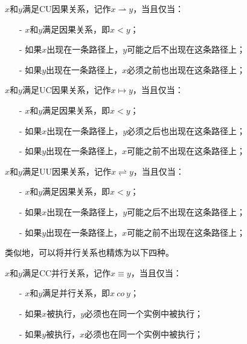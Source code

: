 \begin{definition}\label{def:c_u_causal}
$x$和$y$满足CU因果关系，记作$x\rightharpoonup y$，当且仅当：
  \begin{itemize}
    \item[-] $x$和$y$满足因果关系，即$x<y$；
    \item[-] 如果$x$出现在一条路径上，$y$可能之后不出现在这条路径上；
    \item[-] 如果$y$出现在一条路径上，$x$必须之前也出现在这条路径上；
  \end{itemize}
\end{definition}

\begin{definition}\label{def:u_c_causal}
$x$和$y$满足UC因果关系，记作$x\mapsto y$，当且仅当：
  \begin{itemize}
    \item[-] $x$和$y$满足因果关系，即$x<y$；
    \item[-] 如果$x$出现在一条路径上，$y$必须之后也出现在这条路径上；
    \item[-] 如果$y$出现在一条路径上，$x$可能之前不出现在这条路径上；
  \end{itemize}
\end{definition}

\begin{definition}\label{def:u_u_causal}
$x$和$y$满足UU因果关系，记作$x\rightleftharpoons y$，当且仅当：
  \begin{itemize}
    \item[-] $x$和$y$满足因果关系，即$x<y$；
    \item[-] 如果$x$出现在一条路径上，$y$可能之后不出现在这条路径上；
    \item[-] 如果$y$出现在一条路径上，$x$可能之前不出现在这条路径上；
  \end{itemize}
\end{definition}

类似地，可以将并行关系也精炼为以下四种。

\begin{definition}\label{def:c_c_concurrency}
$x$和$y$满足CC并行关系，记作$x\equiv y$，当且仅当：
  \begin{itemize}
    \item[-] $x$和$y$满足并行关系，即$x~co~y$；
    \item[-] 如果$x$被执行，$y$必须也在同一个实例中被执行；
    \item[-] 如果$y$被执行，$x$必须也在同一个实例中被执行；
  \end{itemize}
\end{definition}

